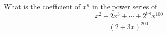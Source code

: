   What is the coefficient of $x^n$ in the power series of
  \[
    \frac{x^2 + 2x^3 + \cdots + 2^{98}x^{100}}{(2 + 3x)^{200}}
  \]
